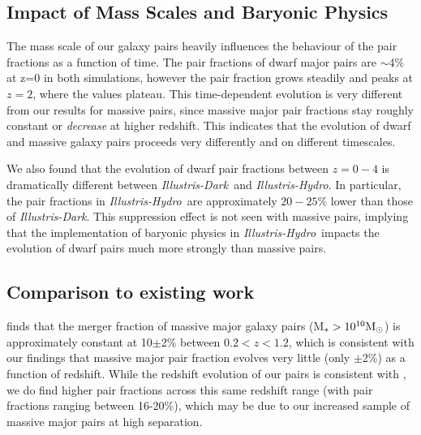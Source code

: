 \documentclass[twocolumn]{aastex63}
\newcommand\msun{\rm{M}_{\odot}}
\newcommand\ID{\textit{Illustris-Dark}}
\newcommand\IH{\textit{Illustris-Hydro}}
\begin{document}
\subsection{Impact of Mass Scales and Baryonic Physics}\label{sec:baryonImpact}
The mass scale of our galaxy pairs heavily influences the behaviour of the pair fractions as a function of time. The pair fractions of dwarf major pairs are $\sim$4\% at z=0 in both simulations, however the pair fraction grows steadily and peaks at $z=2$, where the values plateau. This time-dependent evolution is very different from our results for massive pairs, since massive major pair fractions stay roughly constant or \textit{decrease} at higher redshift. This indicates that the evolution of dwarf and massive galaxy pairs proceeds very differently and on different timescales. 

We also found that the evolution of dwarf pair fractions between $z=0-4$ is dramatically different between \ID\ and \IH. In particular, the pair fractions in \IH\ are approximately $20-25\%$ lower than those of \ID. This suppression effect is not seen with massive pairs, implying that the implementation of baryonic physics in \IH\ impacts the evolution of dwarf pairs much more strongly than massive pairs. 



\subsection{Comparison to existing work}\label{sec:litcompare}

\citet{lotz08} finds that the merger fraction of massive major galaxy pairs (M$_*>10^{10}\msun$) is approximately constant at 10$\pm$2\% between $0.2<z<1.2$, which is consistent with our findings that massive major pair fraction evolves very little (only $\pm$2\%) as a function of redshift. While the redshift evolution of our pairs is consistent with \citet{lotz08}, we do find higher pair fractions across this same redshift range (with pair fractions ranging between 16-20\%), which may be due to our increased sample of massive major pairs at high separation. 
\end{document}
